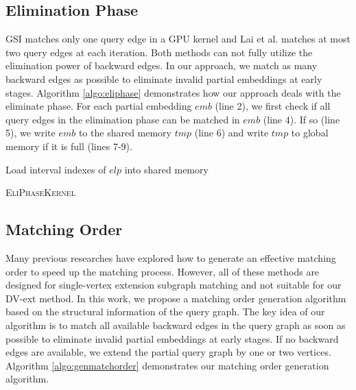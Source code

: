 \subsection{Elimination Phase} \label{sec:eliphase}
GSI \cite{zeng2020gsi} matches only one query edge in a GPU kernel and Lai et al. \cite{lai2015scalable} matches at most two query edges at each iteration. Both methods can not fully utilize the elimination power of backward edges. In our approach, we match as many backward edges as possible to eliminate invalid partial embeddings at early stages. Algorithm \ref{algo:eliphase} demonstrates how our approach deals with the eliminate phase. For each partial embedding $emb$ (line 2), we first check if all query edges in the elimination phase can be matched in $emb$ (line 4). If so (line 5), we write $emb$ to the shared memory $tmp$ (line 6) and write $tmp$ to global memory if it is full (lines 7-9).
\begin{algorithm}
Load interval indexes of $elp$ into shared memory\;
\caption{\textsc{EliPhaseKernel}}
\label{algo:eliphase}
\end{algorithm}



\subsection{Matching Order}
Many previous researches \cite{bi2016efficient,sun2020subgraph,sun2020rapidmatch,guo2020gpu} have explored how to generate an effective matching order to speed up the matching process. However, all of these methods are designed for single-vertex extension subgraph matching and not suitable for our DV-ext method. In this work, we propose a matching order generation algorithm based on the structural information of the query graph. The key idea of our algorithm is to match all available backward edges in the query graph as soon as possible to eliminate invalid partial embeddings at early stages. If no backward edges are available, we extend the partial query graph by one or two vertices. Algorithm \ref{algo:genmatchorder} demonstrates our matching order generation algorithm.

